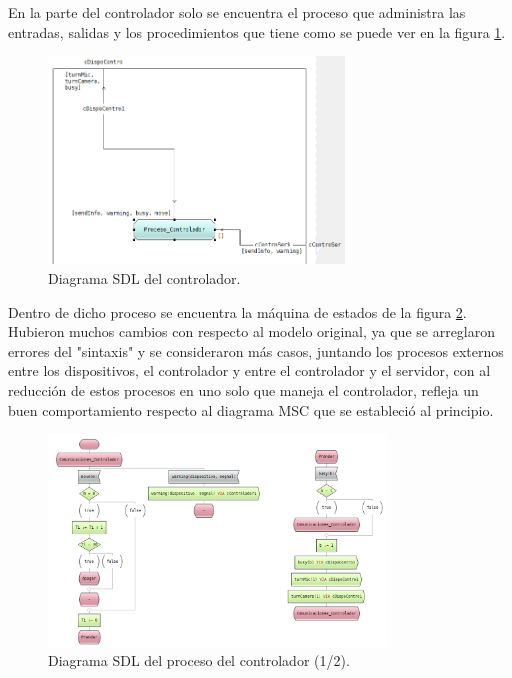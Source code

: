 \pagebreak

En la parte del controlador solo se encuentra el proceso que administra las entradas, salidas y los procedimientos que tiene como se puede ver en la figura \ref{ControladorSDL}.

\begin{figure}[h]
    \centering
    \includegraphics[width=0.7\textwidth]{images/Controladorx.png}
    \caption{Diagrama SDL del controlador.}
    \label{ControladorSDL}
\end{figure}

Dentro de dicho proceso se encuentra la máquina de estados de la figura \ref{ProcesoControladorSDL1}. Hubieron muchos cambios con respecto al modelo original, ya que se arreglaron errores del "sintaxis" y se consideraron más casos, juntando los procesos externos entre los dispositivos, el controlador y entre el controlador y el servidor, con al reducción de estos procesos en uno solo que maneja el controlador, refleja un buen comportamiento respecto al diagrama MSC que se estableció al principio.

\begin{figure}[h]
    \centering
    \includegraphics[width=0.8\textwidth]{images/Proceso_Controlador1x.png}
    \caption{Diagrama SDL del proceso del controlador (1/2).}
    \label{ProcesoControladorSDL1}
\end{figure}

